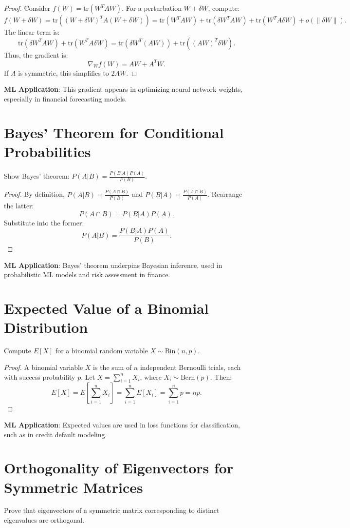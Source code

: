 \documentclass{article}
\theoremstyle{plain}
\theoremstyle{definition}
\newtheorem{proof}
\begin{document}
\begin{proof}
Consider $f(W) = \text{tr}(W^T A W)$. For a perturbation $W + \delta W$, compute:
\[
f(W + \delta W) = \text{tr}((W + \delta W)^T A (W + \delta W)) = \text{tr}(W^T A W) + \text{tr}(\delta W^T A W) + \text{tr}(W^T A \delta W) + o(\|\delta W\|).
\]
The linear term is:
\[
\text{tr}(\delta W^T A W) + \text{tr}(W^T A \delta W) = \text{tr}(\delta W^T (A W)) + \text{tr}((A W)^T \delta W).
\]
Thus, the gradient is:
\[
\nabla_W f(W) = A W + A^T W.
\]
If $A$ is symmetric, this simplifies to $2 A W$.
\end{proof}
\textbf{ML Application}: This gradient appears in optimizing neural network weights, especially in financial forecasting models.

\section{Bayes’ Theorem for Conditional Probabilities}
Show Bayes’ theorem: $P(A|B) = \frac{P(B|A) P(A)}{P(B)}$.

\begin{proof}
By definition, $P(A|B) = \frac{P(A \cap B)}{P(B)}$ and $P(B|A) = \frac{P(A \cap B)}{P(A)}$. Rearrange the latter:
\[
P(A \cap B) = P(B|A) P(A).
\]
Substitute into the former:
\[
P(A|B) = \frac{P(B|A) P(A)}{P(B)}.
\]
\end{proof}
\textbf{ML Application}: Bayes’ theorem underpins Bayesian inference, used in probabilistic ML models and risk assessment in finance.

\section{Expected Value of a Binomial Distribution}
Compute $E[X]$ for a binomial random variable $X \sim \text{Bin}(n, p)$.

\begin{proof}
A binomial variable $X$ is the sum of $n$ independent Bernoulli trials, each with success probability $p$. Let $X = \sum_{i=1}^n X_i$, where $X_i \sim \text{Bern}(p)$. Then:
\[
E[X] = E\left[\sum_{i=1}^n X_i\right] = \sum_{i=1}^n E[X_i] = \sum_{i=1}^n p = n p.
\]
\end{proof}
\textbf{ML Application}: Expected values are used in loss functions for classification, such as in credit default modeling.

\section{Orthogonality of Eigenvectors for Symmetric Matrices}
Prove that eigenvectors of a symmetric matrix corresponding to distinct eigenvalues are orthogonal.
\end{document}
